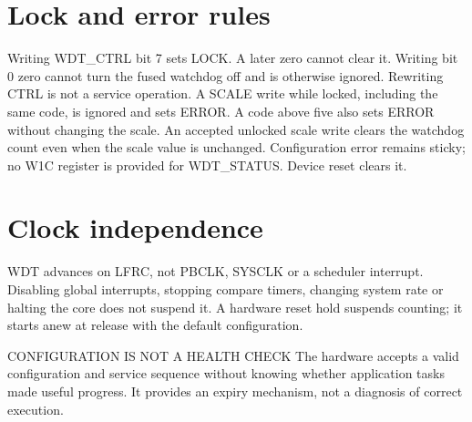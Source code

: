 \documentclass[10pt]{article}
\begin{document}
\section*{Lock and error rules}
Writing WDT\_CTRL bit 7 sets LOCK. A later zero cannot clear it. Writing bit 0 zero cannot turn the fused watchdog off and is otherwise ignored. Rewriting CTRL is not a service operation.
A SCALE write while locked, including the same code, is ignored and sets ERROR. A code above five also sets ERROR without changing the scale. An accepted unlocked scale write clears the watchdog count even when the scale value is unchanged. Configuration error remains sticky; no W1C register is provided for WDT\_STATUS. Device reset clears it.
\section*{Clock independence}
WDT advances on LFRC, not PBCLK, SYSCLK or a scheduler interrupt. Disabling global interrupts, stopping compare timers, changing system rate or halting the core does not suspend it. A hardware reset hold suspends counting; it starts anew at release with the default configuration.
\begin{Notice}{CONFIGURATION IS NOT A HEALTH CHECK}
The hardware accepts a valid configuration and service sequence without knowing whether application tasks made useful progress. It provides an expiry mechanism, not a diagnosis of correct execution.
\end{Notice}

\newpage
{}
\end{document}
